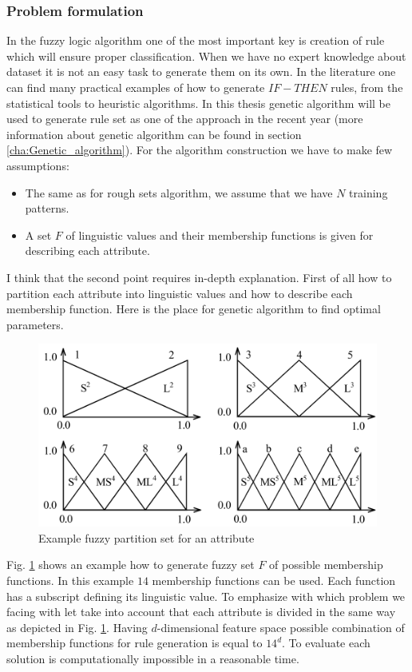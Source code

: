 \subsubsection{Problem formulation}
\label{cha:Fuzzy_logic_basic_problem_formulation}
In the fuzzy logic algorithm one of the most important key is creation of rule
which will ensure proper classification. When we have no expert knowledge about
dataset it is not an easy task to generate them on its own. In the literature
one can find many practical examples of how to generate $IF-THEN$ rules, from
the statistical tools to heuristic algorithms. In this thesis genetic
algorithm will be used to generate rule set as one of the approach in the
recent year (more information about genetic algorithm can be found in section
\ref{cha:Genetic_algorithm}).
For the algorithm construction we have to make few assumptions:
\begin{itemize}
    \item The same as for rough sets algorithm, we assume that we have $N$
        training patterns.
    \item A set $F$ of linguistic values and their membership functions is given
        for describing each attribute. 
\end{itemize}
I think that the second point requires in-depth explanation. First of all how
to partition each attribute into linguistic values and how to describe each
membership function. Here is the place for genetic algorithm to find optimal
parameters. 
\begin{figure}[H]
    \begin{center}
        \includegraphics[width=\textwidth]{fig/fuzzy_example.png}
    \end{center}
    \caption{Example fuzzy partition set for an attribute}
    \label{fig:fuzzy_example}
\end{figure}
Fig. \ref{fig:fuzzy_example} shows an example how to generate fuzzy set $F$ of
possible membership functions. In this example $14$ membership functions can be
used. Each function has a subscript defining its linguistic value. To emphasize
with which problem we facing with let take into account that each attribute is divided 
in the same way as depicted in Fig. \ref{fig:fuzzy_example}. Having
$d$-dimensional feature space possible combination of membership functions for
rule generation is equal to $14^d$. To evaluate each solution is
computationally impossible in a reasonable time. 

